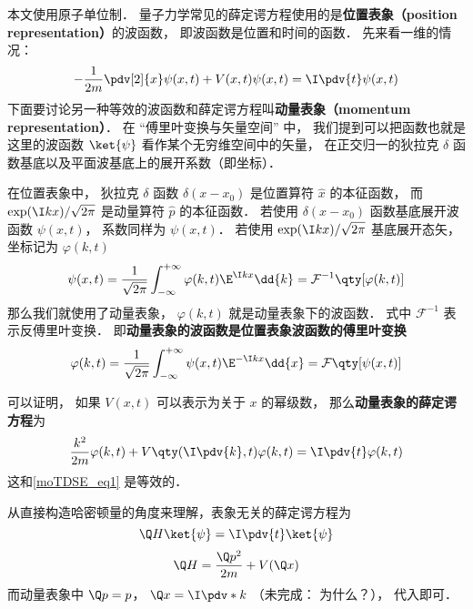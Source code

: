 

本文使用原子单位制． 量子力学常见的薛定谔方程使用的是\textbf{位置表象（position representation）}的波函数， 即波函数是位置和时间的函数． 先来看一维的情况：
\begin{equation}\label{moTDSE_eq1}
-\frac{1}{2m} \pdv[2]{x}\psi(x, t) + V(x,t)\psi(x,t) = \I \pdv{t} \psi(x,t)
\end{equation}
下面要讨论另一种等效的波函数和薛定谔方程叫\textbf{动量表象（momentum representation）}． 在 “傅里叶变换与矢量空间” 中， 我们提到可以把函数也就是这里的波函数 $\ket{\psi}$ 看作某个无穷维空间中的矢量， 在正交归一的狄拉克 $\delta$ 函数基底以及平面波基底上的展开系数（即坐标）．

在位置表象中， 狄拉克 $\delta$ 函数 $\delta(x-x_0)$ 是位置算符 $\hat x$ 的本征函数， 而 $\exp(\I kx)/\sqrt{2\pi}$ 是动量算符 $\hat p$ 的本征函数． 若使用 $\delta(x-x_0)$ 函数基底展开波函数 $\psi(x, t)$， 系数同样为 $\psi(x, t)$． 若使用 $\exp(\I kx)/\sqrt{2\pi}$ 基底展开态矢， 坐标记为 $\varphi(k, t)$
\begin{equation}\label{moTDSE_eq2}
\psi(x,t) = \frac{1}{\sqrt{2\pi}}\int_{-\infty}^{+\infty} \varphi(k,t)\E^{\I kx}\dd{k} = \mathcal{F}^{-1} \qty[\varphi(k,t)]
\end{equation}
那么我们就使用了动量表象， $\varphi(k, t)$ 就是动量表象下的波函数． 式中 $\mathcal{F}^{-1}$ 表示反傅里叶变换． 即\textbf{动量表象的波函数是位置表象波函数的傅里叶变换}
\begin{equation}
\varphi(k,t) = \frac{1}{\sqrt{2\pi}}\int_{-\infty}^{+\infty} \psi(x,t)\E^{-\I kx}\dd{x} = \mathcal{F}\qty[\psi(x, t)]
\end{equation}

可以证明， 如果 $V(x,t)$ 可以表示为关于 $x$ 的幂级数， 那么\textbf{动量表象的薛定谔方程}为
\begin{equation}\label{moTDSE_eq3}
\frac{k^2}{2m}\varphi(k, t) + V\qty(\I \pdv{k}, t)\varphi(k, t) = \I \pdv{t} \varphi(k,t)
\end{equation}
这和\autoref{moTDSE_eq1} 是等效的．

从直接构造哈密顿量的角度来理解，表象无关的薛定谔方程为
\begin{equation}
\Q H\ket{\psi} = \I \pdv{t}\ket{\psi}
\end{equation}
\begin{equation}
\Q H = \frac{\Q p^2}{2m} + V(\Q x)
\end{equation}
而动量表象中 $\Q p = p$， $\Q x  = \I \pdv*{k}$ （未完成： 为什么？）， 代入即可．

